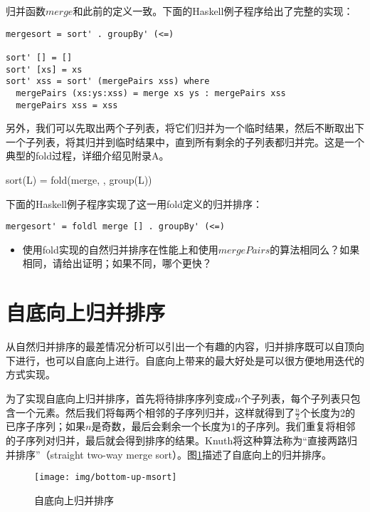 \documentclass{ctexart}
\begin{document}
归并函数$merge$和此前的定义一致。下面的Haskell例子程序给出了完整的实现：

\lstset{language=Haskell}
\begin{lstlisting}[style=Haskell]
mergesort = sort' . groupBy' (<=)

sort' [] = []
sort' [xs] = xs
sort' xss = sort' (mergePairs xss) where
  mergePairs (xs:ys:xss) = merge xs ys : mergePairs xss
  mergePairs xss = xss
\end{lstlisting}

另外，我们可以先取出两个子列表，将它们归并为一个临时结果，然后不断取出下一个子列表，将其归并到临时结果中，直到所有剩余的子列表都归并完。这是一个典型的fold过程，详细介绍见附录A。

\be
sort(L) = fold(merge, \phi, group(L))
\ee

下面的Haskell例子程序实现了这一用fold定义的归并排序：

\lstset{language=Haskell}
\begin{lstlisting}[style=Haskell]
mergesort' = foldl merge [] . groupBy' (<=)
\end{lstlisting}

\begin{Exercise}
\begin{itemize}
  \item 使用fold实现的自然归并排序在性能上和使用$mergePairs$的算法相同么？如果相同，请给出证明；如果不同，哪个更快？
\end{itemize}
\end{Exercise}

\section{自底向上归并排序}

从自然归并排序的最差情况分析可以引出一个有趣的内容，归并排序既可以自顶向下进行，也可以自底向上进行。自底向上带来的最大好处是可以很方便地用迭代的方式实现。

为了实现自底向上归并排序，首先将待排序序列变成$n$个子列表，每个子列表只包含一个元素。然后我们将每两个相邻的子序列归并，这样就得到了$\frac{n}{2}$个长度为2的已序子序列；如果$n$是奇数，最后会剩余一个长度为1的子序列。我们重复将相邻的子序列对归并，最后就会得到排序的结果。Knuth将这种算法称为“直接两路归并排序”（straight two-way merge sort）\cite{TAOCP}。图\ref{fig:bottom-up-msort}描述了自底向上的归并排序。

\begin{figure}[htbp]
 \centering
 \texttt{[image: img/bottom-up-msort]}
 \caption{自底向上归并排序}
 \label{fig:bottom-up-msort}
\end{figure}
\end{document}
